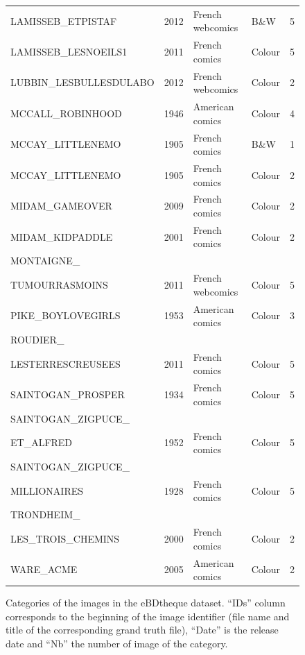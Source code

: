 \begin{figure}[!ht]
\begin{center}
\begin{tabular}{|lllll|}
	LAMISSEB\_ETPISTAF                     & 2012        & French webcomics & B\&W       & 5        \\
	LAMISSEB\_LESNOEILS1                   & 2011        & French comics    & Colour     & 5        \\
	LUBBIN\_LESBULLESDULABO                & 2012        & French webcomics & Colour     & 2        \\
	MCCALL\_ROBINHOOD                      & 1946        & American comics  & Colour     & 4        \\
	MCCAY\_LITTLENEMO                      & 1905        & French comics    & B\&W       & 1        \\
	MCCAY\_LITTLENEMO                      & 1905        & French comics    & Colour     & 2        \\
	MIDAM\_GAMEOVER                        & 2009        & French comics    & Colour     & 2        \\
	MIDAM\_KIDPADDLE                       & 2001        & French comics    & Colour     & 2        \\
	MONTAIGNE\_ \\ TUMOURRASMOINS          & 2011        & French webcomics & Colour     & 5        \\
	PIKE\_BOYLOVEGIRLS                     & 1953        & American comics  & Colour     & 3        \\
	ROUDIER\_ \\ LESTERRESCREUSEES             & 2011        & French comics    & Colour     & 5        \\
	SAINTOGAN\_PROSPER 						& 1934        & French comics    & Colour     & 5        \\
	SAINTOGAN\_ZIGPUCE\_ \\ ET\_ALFRED           & 1952        & French comics    & Colour     & 5        \\
	SAINTOGAN\_ZIGPUCE\_ \\ MILLIONAIRES        & 1928        & French comics    & Colour     & 5        \\
	TRONDHEIM\_ \\ LES\_TROIS\_CHEMINS           & 2000        & French comics    & Colour     & 2        \\
	WARE\_ACME                             & 2005        & American comics  & Colour     & 2        \\
	\hline
	\end{tabular}
\caption[Categories of the images in the eBDtheque dataset]{Categories of the images in the eBDtheque dataset. ``IDs'' column corresponds to the beginning of the image identifier (file name and title of the corresponding grand truth file), ``Date'' is the release date and ``Nb'' the number of image of the category.}
\label{app:ebdtheque_image_classification}
\end{center}
\end{figure}	


